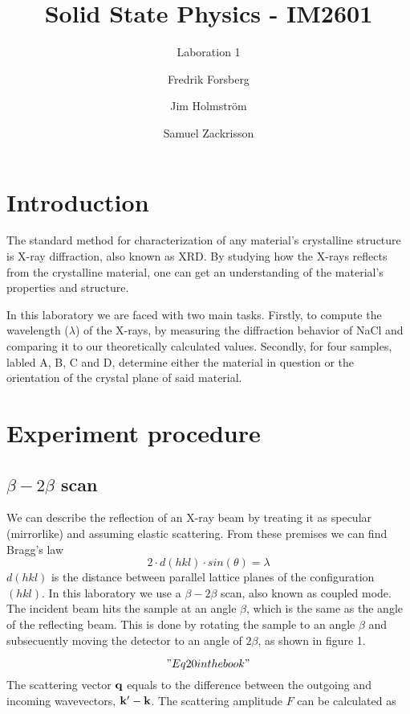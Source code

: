 \documentclass[a4paper,twoside=false,abstract=false,numbers=noenddot,
titlepage=false,headings=small,parskip=half,version=last]{scrartcl}
\title{Solid State Physics - IM2601}
\subtitle{Laboration 1}
\author[1]{Fredrik Forsberg}
\author[1]{Jim Holmström}
\author[1]{Samuel Zackrisson}
\affil[1]{Engineering Physics, Royal Institute of Technology}
\affil[1]{\{fforsber, jimho, samuelz\}@kth.se}
\begin{document}
\maketitle
\thispagestyle{empty}

\section{Introduction}
The standard method for characterization of any material's crystalline structure is X-ray diffraction, also known as XRD.
By studying how the X-rays reflects from the crystalline material, one can get an understanding of the material's properties and structure.

In this laboratory we are faced with two main tasks.
Firstly, to compute the wavelength ($\lambda$) of the X-rays, by measuring the diffraction behavior of NaCl and comparing it to our theoretically calculated values.
Secondly, for four samples, labled A, B, C and D, determine either the material in question or the orientation of the crystal plane of said material.

\section{Experiment procedure}
\subsection{$\beta-2\beta$ scan}
We can describe the reflection of an X-ray beam by treating it as specular (mirrorlike) and assuming elastic scattering. From these premises we can find Bragg's law
\begin{equation}
    \label{eq:braggs}
    2 \cdot d(hkl) \cdot sin( \theta ) = \lambda
\end{equation}
$d(hkl)$ is the distance between parallel lattice planes of the configuration $(hkl)$. In this laboratory we use a $\beta-2\beta$ scan, also known as coupled mode. The incident beam hits the sample at an angle $\beta$, which is the same as the angle of the reflecting beam. This is done by rotating the sample to an angle $\beta$ and subsecuently moving the detector to an angle of $2\beta$, as shown in figure 1.

\begin{equation}
    \label{eq:scatamp}
    "Eq 20 in the book"
\end{equation}
The scattering vector $\bold{q}$ equals to the difference between the outgoing and incoming wavevectors, $\bold{k}' - \bold{k}$. The scattering amplitude $F$ can be calculated as
\end{document}
